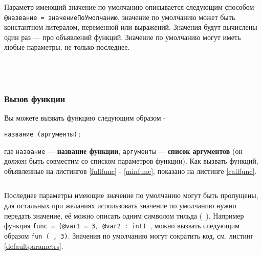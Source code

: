 Параметр имеющий значение по умолчанию описывается следующим способом \texttt{@название = значениеПоУмолчанию}, значение по умолчанию может быть константном литералом, переменной или выражений. Значения будут вычислены один раз — про объявлений функций. Значение по умолчанию могут иметь любые параметры, не только последнее.

\begin{sourcecode}
	\label{fullfunc}
	\inputminted[linenos]{icl}{../sources/fullfunc.icL}
\end{sourcecode}

\begin{sourcecode}
	\label{noargsfunc}
	\inputminted[linenos]{icl}{../sources/noargsfunc.icL}
\end{sourcecode}

\begin{sourcecode}
	\label{notypefunc}
	\inputminted[linenos]{icl}{../sources/notypefunc.icL}
\end{sourcecode}

\begin{sourcecode}
	\label{minfunc}
	\inputminted[linenos]{icl}{../sources/minfunc.icL}
\end{sourcecode}

\subsubsection{Вызов функции}

Вы можете вызвать функцию следующим образом -
\begin{verbatim}
название (аргументы);
\end{verbatim}
где \texttt{название} — {\bf название функции}, \texttt{аргументы} — {\bf список аргументов} (он должен быть совместим со списком параметров функции). Как вызвать функций, объявленные на листингов \ref{fullfunc} - \ref{minfunc}, показано на листинге \ref{callfunc}. 

\begin{sourcecode}
	\label{callfunc}
	\inputminted[linenos]{icl}{../sources/callfunc.icL}
\end{sourcecode}

Последнее параметры имеющие значение по умолчанию могут быть пропущены, для остальных при желаниях использовать значение по умолчанию нужно передать \void{} значение, её можно описать одним символом тильда (\texttt{~}). Например функция \texttt{func = (@var1 = 3, @var2 : int) {}}, можно вызвать следующим образом \texttt{fun (~, 3)}. Значения по умолчанию могут сократить код, см. листинг \ref{defaultparametrs}.

